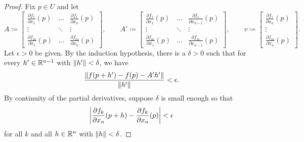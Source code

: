 \begin{proof}
Fix $p \in U$ and let
\begin{equation*}
A \coloneqq 
\begin{bmatrix}
\frac{\partial f_1}{\partial x_1}(p)
& \ldots &
\frac{\partial f_1}{\partial x_n}(p)
\\
\vdots & \ddots & \vdots
\\
\frac{\partial f_m}{\partial x_1}(p)
& \ldots &
\frac{\partial f_m}{\partial x_n}(p)
\end{bmatrix} ,
\qquad
A' \coloneqq 
\begin{bmatrix}
\frac{\partial f_1}{\partial x_1}(p)
& \ldots &
\frac{\partial f_1}{\partial x_{n-1}}(p)
\\
\vdots & \ddots & \vdots
\\
\frac{\partial f_m}{\partial x_1}(p)
& \ldots &
\frac{\partial f_m}{\partial x_{n-1}}(p)
\end{bmatrix} ,
\qquad
v \coloneqq 
\begin{bmatrix}
\frac{\partial f_1}{\partial x_n}(p)
\\
\vdots
\\
\frac{\partial f_m}{\partial x_n}(p)
\end{bmatrix} .
\end{equation*}
Let $\epsilon > 0$ be given.  By the induction hypothesis, there
is a $\delta > 0$ such that
for every $h' \in {\mathbb{R}}^{n-1}$ with $\lVert {h'} \rVert < \delta$, we have
\begin{equation*}
\frac{\lVert {f(p+h') - f(p) - A' h'} \rVert}{\lVert {h'} \rVert} < \epsilon .
\end{equation*}
By continuity of the partial derivatives, suppose $\delta$ is small
enough so that
\begin{equation*}
\left\lvert {\frac{\partial f_k}{\partial x_n}(p+h)
      - \frac{\partial f_k}{\partial x_n}(p)} \right\rvert < \epsilon
\end{equation*}
for all $k$ and all $h \in {\mathbb{R}}^n$ with $\lVert {h} \rVert < \delta$.


\end{proof}
